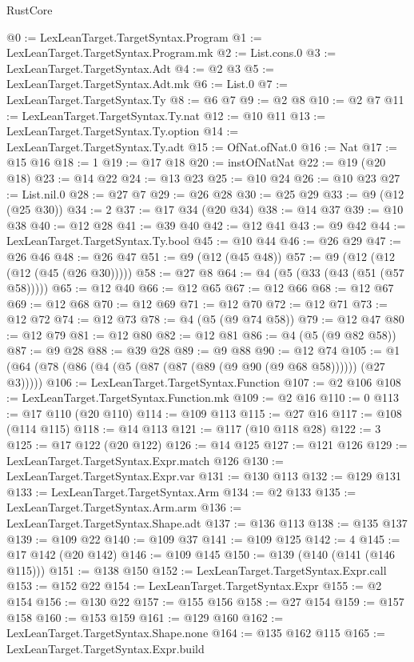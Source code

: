 \begin{lexlean}{RustCore}
\begin{coremodule}
@0 := LexLeanTarget.TargetSyntax.Program
@1 := LexLeanTarget.TargetSyntax.Program.mk
@2 := List.cons.{0}
@3 := LexLeanTarget.TargetSyntax.Adt
@4 := @2 @3
@5 := LexLeanTarget.TargetSyntax.Adt.mk
@6 := List.{0}
@7 := LexLeanTarget.TargetSyntax.Ty
@8 := @6 @7
@9 := @2 @8
@10 := @2 @7
@11 := LexLeanTarget.TargetSyntax.Ty.nat
@12 := @10 @11
@13 := LexLeanTarget.TargetSyntax.Ty.option
@14 := LexLeanTarget.TargetSyntax.Ty.adt
@15 := OfNat.ofNat.{0}
@16 := Nat
@17 := @15 @16
@18 := 1
@19 := @17 @18
@20 := instOfNatNat
@22 := @19 (@20 @18)
@23 := @14 @22
@24 := @13 @23
@25 := @10 @24
@26 := @10 @23
@27 := List.nil.{0}
@28 := @27 @7
@29 := @26 @28
@30 := @25 @29
@33 := @9 (@12 (@25 @30))
@34 := 2
@37 := @17 @34 (@20 @34)
@38 := @14 @37
@39 := @10 @38
@40 := @12 @28
@41 := @39 @40
@42 := @12 @41
@43 := @9 @42
@44 := LexLeanTarget.TargetSyntax.Ty.bool
@45 := @10 @44
@46 := @26 @29
@47 := @26 @46
@48 := @26 @47
@51 := @9 (@12 (@45 @48))
@57 := @9 (@12 (@12 (@12 (@45 (@26 @30)))))
@58 := @27 @8
@64 := @4 (@5 (@33 (@43 (@51 (@57 @58)))))
@65 := @12 @40
@66 := @12 @65
@67 := @12 @66
@68 := @12 @67
@69 := @12 @68
@70 := @12 @69
@71 := @12 @70
@72 := @12 @71
@73 := @12 @72
@74 := @12 @73
@78 := @4 (@5 (@9 @74 @58))
@79 := @12 @47
@80 := @12 @79
@81 := @12 @80
@82 := @12 @81
@86 := @4 (@5 (@9 @82 @58))
@87 := @9 @28
@88 := @39 @28
@89 := @9 @88
@90 := @12 @74
@105 := @1 (@64 (@78 (@86 (@4 (@5 (@87 (@87 (@89 (@9 @90 (@9 @68 @58)))))) (@27 @3)))))
@106 := LexLeanTarget.TargetSyntax.Function
@107 := @2 @106
@108 := LexLeanTarget.TargetSyntax.Function.mk
@109 := @2 @16
@110 := 0
@113 := @17 @110 (@20 @110)
@114 := @109 @113
@115 := @27 @16
@117 := @108 (@114 @115)
@118 := @14 @113
@121 := @117 (@10 @118 @28)
@122 := 3
@125 := @17 @122 (@20 @122)
@126 := @14 @125
@127 := @121 @126
@129 := LexLeanTarget.TargetSyntax.Expr.match @126
@130 := LexLeanTarget.TargetSyntax.Expr.var
@131 := @130 @113
@132 := @129 @131
@133 := LexLeanTarget.TargetSyntax.Arm
@134 := @2 @133
@135 := LexLeanTarget.TargetSyntax.Arm.arm
@136 := LexLeanTarget.TargetSyntax.Shape.adt
@137 := @136 @113
@138 := @135 @137
@139 := @109 @22
@140 := @109 @37
@141 := @109 @125
@142 := 4
@145 := @17 @142 (@20 @142)
@146 := @109 @145
@150 := @139 (@140 (@141 (@146 @115)))
@151 := @138 @150
@152 := LexLeanTarget.TargetSyntax.Expr.call
@153 := @152 @22
@154 := LexLeanTarget.TargetSyntax.Expr
@155 := @2 @154
@156 := @130 @22
@157 := @155 @156
@158 := @27 @154
@159 := @157 @158
@160 := @153 @159
@161 := @129 @160
@162 := LexLeanTarget.TargetSyntax.Shape.none
@164 := @135 @162 @115
@165 := LexLeanTarget.TargetSyntax.Expr.build

\end{coremodule}
\end{lexlean}
